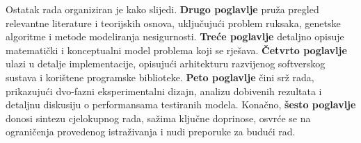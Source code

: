 Ostatak rada organiziran je kako slijedi. \textbf{Drugo poglavlje} pruža pregled relevantne literature i teorijskih osnova, uključujući problem ruksaka, genetske algoritme i metode modeliranja nesigurnosti. \textbf{Treće poglavlje} detaljno opisuje matematički i konceptualni model problema koji se rješava. \textbf{Četvrto poglavlje} ulazi u detalje implementacije, opisujući arhitekturu razvijenog softverskog sustava i korištene programske biblioteke. \textbf{Peto poglavlje} čini srž rada, prikazujući dvo-fazni eksperimentalni dizajn, analizu dobivenih rezultata i detaljnu diskusiju o performansama testiranih modela. Konačno, \textbf{šesto poglavlje} donosi sintezu cjelokupnog rada, sažima ključne doprinose, osvrće se na ograničenja provedenog istraživanja i nudi preporuke za budući rad.

